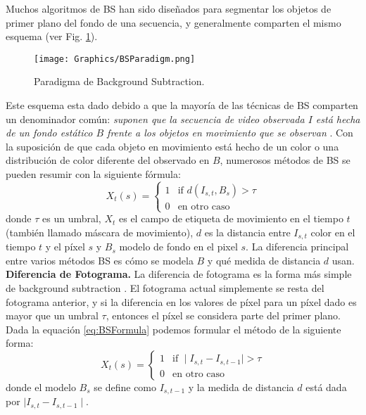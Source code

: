 Muchos algoritmos de BS han sido diseñados para segmentar los objetos de primer plano del fondo de una secuencia, y generalmente comparten el mismo esquema (ver Fig. \ref{fig:BSParadigm}). 
\begin{figure}[h!]
    \centering
    \texttt{[image: Graphics/BSParadigm.png]}
    \caption{Paradigma de Background Subtraction.}
    \label{fig:BSParadigm}
\end{figure}
Este esquema esta dado debido a que la mayoría de las técnicas de BS comparten un denominador común: \textit{suponen que la secuencia de video observada $I$ está hecha de un fondo estático $B$ frente a los objetos en movimiento que se observan} \cite{YannickPierreMarcBrunoHeleneChristophe}. Con la suposición de que cada objeto en movimiento está hecho de un color o una distribución de color diferente del observado en $B$, numerosos métodos de BS se pueden resumir con la siguiente fórmula:
\begin{equation}
X_t(s) = \left\{
\begin{array}{ll}
	1 & \mbox{if } d(I_{s,t}, B_s) > \tau \\
	0               & \mbox{en otro caso}        
\end{array}
\right.
\label{eq:BSFormula}
\end{equation}
donde $\tau$ es un umbral, $X_t$ es el campo de etiqueta de movimiento en el tiempo $t$ (también llamado máscara de movimiento), $d$ es la distancia entre $I_{s,t}$ color en el tiempo $t$ y el píxel $s$ y $B_s$ modelo de fondo en el pixel $s$. La diferencia principal entre varios métodos BS es cómo se modela $B$ y qué medida de distancia $d$ usan.\\

\textbf{Diferencia de Fotograma.}
La diferencia de fotograma es la forma más simple de background subtraction \cite{DeepjoySarat}. El fotograma actual simplemente se resta del fotograma anterior, y si la diferencia en los valores de píxel para un píxel dado es mayor que un umbral $\tau$, entonces el píxel se considera parte del primer plano. Dada la equación \ref{eq:BSFormula} podemos formular el método de la siguiente forma:
$$
X_t(s) = \left\{
\begin{array}{ll}
	1 & \mbox{if } \mid I_{s,t} - I_{s,t-1} \mid > \tau \\
	0               & \mbox{en otro caso}        
\end{array}
\right.
$$
donde el modelo $B_s$ se define como $I_{s,t-1}$ y la medida de distancia $d$ está dada por $\mid I_{s,t} - I_{s,t-1} \mid$.

